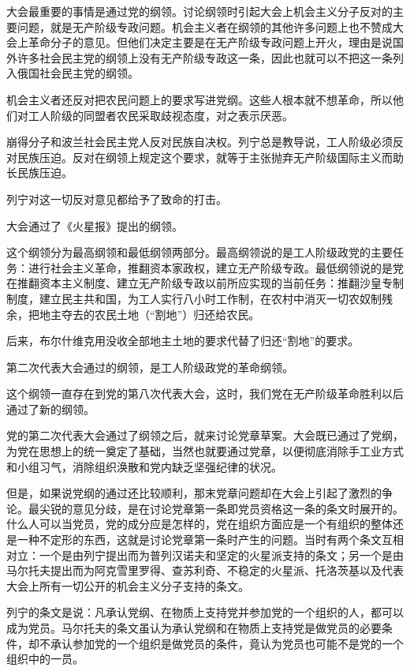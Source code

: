 大会最重要的事情是通过党的纲领。讨论纲领时引起大会上机会主义分子反对的主要问题，就是无产阶级专政问题。机会主义者在纲领的其他许多问题上也不赞成大会上革命分子的意见。但他们决定主要是在无产阶级专政问题上开火，理由是说国外许多社会民主党的纲领上没有无产阶级专政这一条，因此也就可以不把这一条列入俄国社会民主党的纲领。

机会主义者还反对把农民问题上的要求写进党纲。这些人根本就不想革命，所以他们对工人阶级的同盟者农民采取歧视态度，对之表示厌恶。

崩得分子和波兰社会民主党人反对民族自决权。列宁总是教导说，工人阶级必须反对民族压迫。反对在纲领上规定这个要求，就等于主张抛弃无产阶级国际主义而助长民族压迫。

列宁对这一切反对意见都给予了致命的打击。

大会通过了《火星报》提出的纲领。

这个纲领分为最高纲领和最低纲领两部分。最高纲领说的是工人阶级政党的主要任务：进行社会主义革命，推翻资本家政权，建立无产阶级专政。最低纲领说的是党在推翻资本主义制度、建立无产阶级专政以前所应实现的当前任务：推翻沙皇专制制度，建立民主共和国，为工人实行八小时工作制，在农村中消灭一切农奴制残余，把地主夺去的农民土地（“割地”）归还给农民。

后来，布尔什维克用没收全部地主土地的要求代替了归还“割地”的要求。

第二次代表大会通过的纲领，是工人阶级政党的革命纲领。

这个纲领一直存在到党的第八次代表大会，这时，我们党在无产阶级革命胜利以后通过了新的纲领。

党的第二次代表大会通过了纲领之后，就来讨论党章草案。大会既已通过了党纲，为党在思想上的统一奠定了基础，当然也就要通过党章，以便彻底消除手工业方式和小组习气，消除组织涣散和党内缺乏坚强纪律的状况。

但是，如果说党纲的通过还比较顺利，那末党章问题却在大会上引起了激烈的争论。最尖锐的意见分歧，是在讨论党章第一条即党员资格这一条的条文时展开的。什么人可以当党员，党的成分应是怎样的，党在组织方面应是一个有组织的整体还是一种不定形的东西，这就是讨论党章第一条时产生的问题。当时有两个条文互相对立：一个是由列宁提出而为普列汉诺夫和坚定的火星派支持的条文；另一个是由马尔托夫提出而为阿克雪里罗得、查苏利奇、不稳定的火星派、托洛茨基以及代表大会上所有一切公开的机会主义分子支持的条文。

列宁的条文是说：凡承认党纲、在物质上支持党并参加党的一个组织的人，都可以成为党员。马尔托夫的条文虽认为承认党纲和在物质上支持党是做党员的必要条件，却不承认参加党的一个组织是做党员的条件，竟认为党员也可能不是党的一个组织中的一员。

